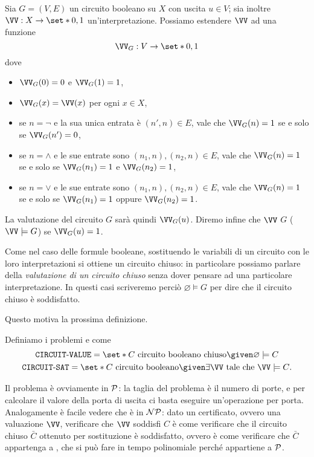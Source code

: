 \begin{definition}
  Sia $G = (V, E)$ un circuito booleano su $X$ con uscita $u \in V$;
  sia inoltre $\VV : X \to \set*{0, 1}$ un'interpretazione. 
  Possiamo estendere $\VV$ ad una funzione \[
      \VV_G : V \to \set*{0, 1}
  \] dove \begin{itemize}
    \item $\VV_G(0) = 0$ e $\VV_G(1) = 1$,
    \item $\VV_G(x) = \VV(x)$ per ogni $x \in X$,
    \item se $n = {\neg}$ e la sua unica entrata è $(n', n) \in E$, vale che
      $\VV_G(n) = 1$ se e solo se $\VV_G(n') = 0$,
    \item se $n = {\land}$ e le sue entrate sono $(n_1, n), (n_2, n) \in E$, vale che
      $\VV_G(n) = 1$ se e solo se $\VV_G(n_1) = 1$ e $\VV_G(n_2) = 1$,  
    \item se $n = {\lor}$ e le sue entrate sono $(n_1, n), (n_2, n) \in E$, vale che
      $\VV_G(n) = 1$ se e solo se $\VV_G(n_1) = 1$ oppure $\VV_G(n_2) = 1$.  
  \end{itemize}

  La valutazione del circuito $G$ sarà quindi $\VV_G(u)$. Diremo infine che
  $\VV$  $G$ ($\VV \models G$) se $\VV_G(u) = 1$.   
\end{definition}

Come nel caso delle formule booleane, sostituendo le variabili di un circuito con
le loro interpretazioni si ottiene un circuito chiuso: in particolare possiamo
parlare della \emph{valutazione di un circuito chiuso} senza dover pensare ad una
particolare interpretazione. In questi casi scriveremo perciò 
$\varnothing \models G$ per dire che il circuito chiuso è soddisfatto.

Questo motiva la prossima definizione.

\begin{definition}
  Definiamo i problemi \CVAL{} e \CSAT{} come \begin{gather*}
      \CVAL = \set*{C \text{ circuito booleano chiuso} \given \varnothing \models C}\\
      \CSAT = \set*{C \text{ circuito booleano} \given \exists 
        \VV \text{ tale che } \VV \models C}.
  \end{gather*}
\end{definition}

Il problema \CVAL{} è ovviamente in $\P$: la taglia del problema è il numero di
porte, e per calcolare il valore della porta di uscita ci basta eseguire un'operazione
per porta. Analogamente è facile vedere che \CSAT{} è in $\NP$: dato un certificato,
ovvero una valuazione $\VV$, verificare che $\VV$ soddisfi $C$ è come verificare
che il circuito chiuso $\bar{C}$ ottenuto per sostituzione è soddisfatto, ovvero     
è come verificare che $\bar{C}$ appartenga a \CVAL, che si può fare in tempo
polinomiale perché \CVAL{} appartiene a $\P$.


